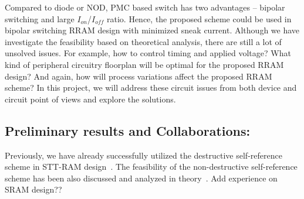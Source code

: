 Compared to diode or NOD, PMC based switch has two advantages -- bipolar switching and large $I_{on}$/$I_{off}$ ratio. Hence, the proposed scheme could be used in bipolar switching RRAM design with minimized sneak current. Although we have investigate the feasibility based on theoretical analysis, there are still a lot of unsolved issues. For example, how to control timing and applied voltage? What kind of peripheral circuitry floorplan will be optimal for the proposed RRAM design? And again, how will process variations affect the proposed RRAM scheme? In this project, we will address these circuit issues from both device and circuit point of views and explore the solutions.


\subsection{Preliminary results and Collaborations:}
Previously, we have already successfully utilized the destructive self-reference scheme in STT-RAM design~\cite{Li:147723}. The feasibility of the non-destructive self-reference scheme has been also discussed and analyzed in theory~\cite{Chen:147727}.
Add experience on SRAM design??
